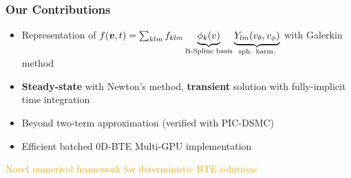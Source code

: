 \documentclass[mathserif, aspectratio=169]{beamer}
\newcommand{\vect}[1]{\boldsymbol{#1}}
\newcommand{\of}[1]{\mleft( #1 \mright)}
\begin{document}
\begin{frame}
	\frametitle{Our Contributions}
	\begin{itemize}
		\item Representation of $f\of{\vect{v},t} = \sum_{klm} f_{klm} \underbrace{\phi_k\of{v}}_{\text{B-Spline basis}} \underbrace{Y_{lm}\of{v_\theta, v_\phi}}_{\tiny\text{sph. harm.}}$ with Galerkin method
		\item \textbf{Steady-state} with Newton's method, \textbf{transient} solution with fully-implicit time integration
		\item Beyond two-term approximation (verified with PIC-DSMC)
		\item Efficient batched 0D-BTE Multi-GPU implementation
	\end{itemize}
	\textcolor{orange}{Novel numerical framework for deterministic BTE solutions}
\end{frame}
\end{document}
